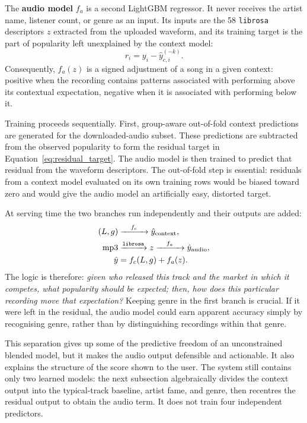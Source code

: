 \documentclass[10pt,twocolumn]{article}
\begin{document}
The \textbf{audio model} $f_a$ is a second LightGBM regressor. It never receives
the artist name, listener count, or genre as an input. Its inputs are the 58
\texttt{librosa} descriptors $z$ extracted from the uploaded waveform, and its
training target is the part of popularity left unexplained by the context model:
\begin{equation}
r_i = y_i - \hat{y}^{(-k)}_{c,i}.
\label{eq:residual_target}
\end{equation}
Consequently, $f_a(z)$ is a
signed adjustment of a song in a given context: positive when the recording contains patterns associated
with performing above its contextual expectation, negative when it is associated
with performing below it.

Training proceeds sequentially. First, group-aware out-of-fold context
predictions are generated for the downloaded-audio subset. These predictions
are subtracted from the observed popularity to form the residual target in
Equation~\ref{eq:residual_target}. The audio model is then trained to predict
that residual from the waveform descriptors. The out-of-fold step is
essential: residuals from a context model evaluated on its own training rows
would be biased toward zero and would give the audio model an artificially
easy, distorted target.

At serving time the two branches run independently and their outputs are added:
\begin{equation}
\begin{aligned}
(L,g) &\xrightarrow{\quad f_c\quad} \hat{y}_{\text{context}},\\
\text{mp3} &\xrightarrow{\text{\texttt{librosa}}} z
             \xrightarrow{\quad f_a\quad} \hat{y}_{\text{audio}},\\
\hat{y} &= f_c(L,g) + f_a(z).
\end{aligned}
\label{eq:two_model_pipeline}
\end{equation}
The logic is therefore: \emph{given who released this track and the market in
which it competes, what popularity should be expected; then, how does this
particular recording move that expectation?} Keeping genre in the first branch
is crucial. If it were left in the residual, the audio model could earn apparent
accuracy simply by recognising genre, rather than by distinguishing recordings
within that genre.

This separation gives up some of the predictive freedom of an unconstrained
blended model, but it makes the audio output defensible and actionable. It also
explains the structure of the score shown to the user. The system still contains
only two learned models: the next subsection algebraically divides the context
output into the typical-track baseline, artist fame, and genre, then recentres
the residual output to obtain the audio term. It does not train four independent
predictors.
\end{document}
